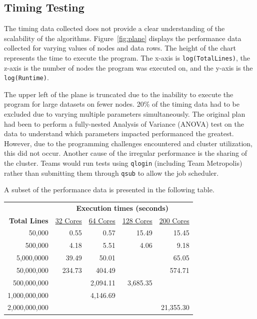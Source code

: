 

%
%

\subsection{Timing Testing}

The timing data collected does not provide a clear understanding of the scalability of the algorithms. Figure~\ref{fig:plane} displays the performance data collected for varying values of nodes and data rows. The height of the chart represents the time to execute the program. The x-axis is \texttt{log(TotalLines)}, the z-axis is the number of nodes the program was executed on, and the y-axis is the \texttt{log(Runtime)}.

The upper left of the plane is truncated due to the inability to execute the program for large datasets on fewer nodes. 20\% of the timing data had to be excluded due to varying multiple parameters simultaneously. The original plan had been to perform a fully-nested Analysis of Variance (ANOVA) test on the data to understand which parameters impacted performanced the greatest. However, due to the programming challenges encountered and cluster utilization, this did not occur. Another cause of the irregular performance is the sharing of the cluster. Teams would run tests using \texttt{qlogin} (including Team Metropolis) rather than submitting them through \texttt{qsub} to allow the job scheduler.

A subset of the performance data is presented in the following table.

\begin{tabular}{r r r r r}
 & \multicolumn{4}{c}{\textbf{Execution times (seconds)}} \\
\textbf{Total Lines} & \underline{32 Cores} & \underline{64 Cores} & \underline{128 Cores} & \underline{200 Cores} \\
       50,000 &   0.55 &     0.57 &     15.49 & 15.45 \\
      500,000 &   4.18 &     5.51 &      4.06 & 9.18 \\
   5,000,0000 &  39.49 &    50.01 &           & 65.05 \\
   50,000,000 & 234.73 &   404.49 &           & 574.71 \\
  500,000,000 &        & 2,094.11 &  3,685.35 & \\
1,000,000,000 &        & 4,146.69 &           &  \\
2,000,000,000 &        &          &           & 21,355.30 \\ 
\end{tabular}

